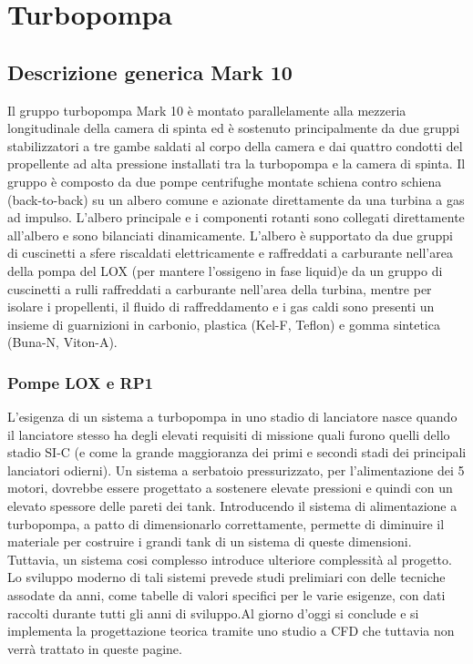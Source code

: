 \section{Turbopompa}
\label{sec:turbopompa}

\subsection{Descrizione generica Mark 10}
\label{subsec:descrizione mark 10}

Il gruppo turbopompa Mark 10 è montato parallelamente alla mezzeria longitudinale della camera di spinta ed è sostenuto principalmente da due gruppi stabilizzatori a tre gambe saldati al corpo della camera e dai quattro condotti del propellente ad alta pressione installati tra la turbopompa e la camera di spinta. 
Il gruppo è composto da due pompe centrifughe montate schiena contro schiena (back-to-back) su un albero comune e azionate direttamente da una turbina a gas ad impulso.
L'albero principale e i componenti rotanti sono collegati direttamente all'albero e sono bilanciati dinamicamente.
L'albero è supportato da due gruppi di cuscinetti a sfere riscaldati elettricamente e raffreddati a carburante nell'area della pompa del LOX (per mantere l'ossigeno in fase liquid)e da un gruppo di cuscinetti a rulli raffreddati a carburante nell'area della turbina, mentre per isolare i propellenti, il fluido di raffreddamento e i gas caldi sono presenti un insieme di guarnizioni in carbonio, plastica (Kel-F, Teflon) e gomma sintetica (Buna-N, Viton-A).

\subsubsection{Pompe LOX e RP1}

L'esigenza di un sistema a turbopompa in uno stadio di lanciatore nasce quando il lanciatore stesso ha degli elevati requisiti di missione quali furono quelli dello stadio SI-C (e come la grande maggioranza dei primi e secondi stadi dei principali lanciatori odierni). Un sistema a serbatoio pressurizzato, per l'alimentazione dei 5 motori, dovrebbe essere progettato a sostenere elevate pressioni e quindi con un elevato spessore delle pareti dei tank. Introducendo il sistema di alimentazione a turbopompa, a patto di dimensionarlo correttamente, permette di diminuire il materiale per costruire i grandi tank di un sistema di queste dimensioni.
Tuttavia, un sistema cosi complesso introduce ulteriore complessità al progetto. Lo sviluppo moderno di tali sistemi prevede studi prelimiari con delle tecniche assodate da anni, come tabelle di valori specifici per le varie esigenze, con dati raccolti durante tutti gli anni di sviluppo.Al giorno d'oggi si conclude e si implementa la progettazione teorica tramite uno studio a CFD che tuttavia non verrà trattato in queste pagine. 

